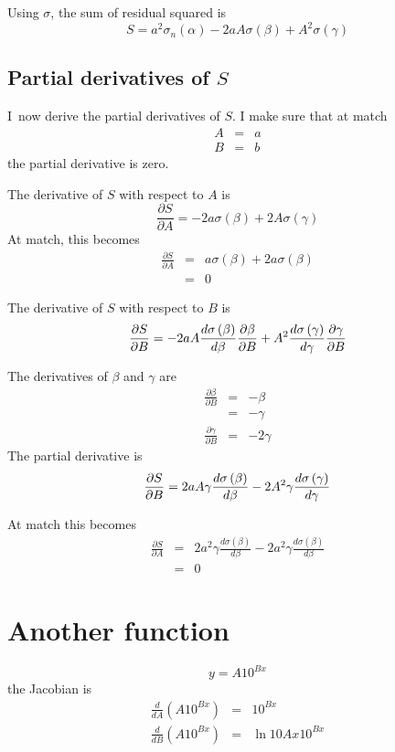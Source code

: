 \documentclass{article}
\begin{document}
Using $\sigma $, the sum of residual squared is%
\begin{equation}
S=a^{2}\sigma _{n}\left( \alpha \right) -2aA\sigma \left( \beta \right)
+A^{2}\sigma \left( \gamma \right)  \label{eq:S(sigma,alpha,beta,gamma)}
\end{equation}

\subsection{Partial derivatives of $S$}

I\ now derive the partial derivatives of $S$. I make sure that at match%
\begin{eqnarray}
A &=&a  \label{def:match} \\
B &=&b
\end{eqnarray}%
the partial derivative is zero.

The derivative of $S$ with respect to $A$ is%
\begin{equation}
\frac{\partial S}{\partial A}=-2a\sigma \left( \beta \right) +2A\sigma
\left( \gamma \right)
\end{equation}%
At match, this becomes%
\begin{eqnarray}
\frac{\partial S}{\partial A} &=&a\sigma \left( \beta \right) +2a\sigma
\left( \beta \right) \\
&=&0
\end{eqnarray}

The derivative of $S$ with respect to $B$ is%
\begin{equation}
\frac{\partial S}{\partial B}=-2aA\frac{d\sigma \left( \beta \right) }{%
d\beta }\frac{\partial \beta }{\partial B}+A^{2}\frac{d\sigma \left( \gamma
\right) }{d\gamma }\frac{\partial \gamma }{\partial B}
\end{equation}

The derivatives of $\beta $ and $\gamma $ are%
\begin{eqnarray}
\frac{\partial \beta }{\partial B} &=&-\beta \\
&=&-\gamma \\
\frac{\partial \gamma }{\partial B} &=&-2\gamma
\end{eqnarray}%
The partial derivative is%
\begin{equation}
\frac{\partial S}{\partial B}=2aA\gamma \frac{d\sigma \left( \beta \right) }{%
d\beta }-2A^{2}\gamma \frac{d\sigma \left( \gamma \right) }{d\gamma }
\end{equation}

At match this becomes%
\begin{eqnarray}
\frac{\partial S}{\partial A} &=&2a^{2}\gamma \frac{d\sigma \left( \beta
\right) }{d\beta }-2a^{2}\gamma \frac{d\sigma \left( \beta \right) }{d\beta }
\\
&=&0
\end{eqnarray}

\section{Another function}

\begin{equation}
y=A10^{Bx}
\end{equation}%
the Jacobian is%
\begin{eqnarray}
\frac{d}{dA}\left( A10^{Bx}\right)  &=&10^{Bx} \\
\frac{d}{dB}\left( A10^{Bx}\right)  &=&\ln 10Ax10^{Bx}
\end{eqnarray}
\end{document}
